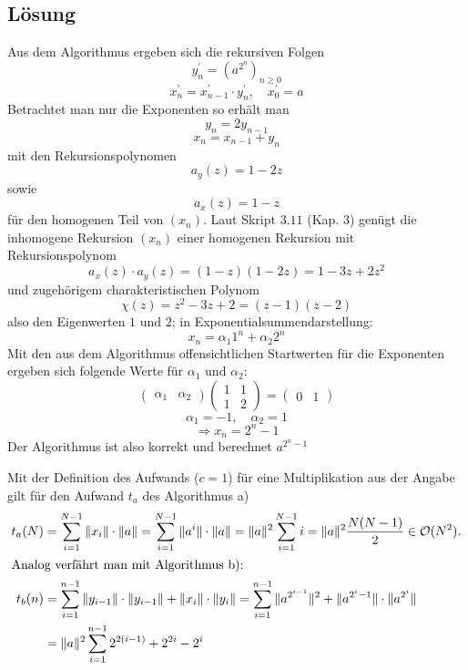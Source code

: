 \subsection*{Lösung}
\begin{flushenum}
\item
  Aus dem Algorithmus ergeben sich die rekursiven Folgen
  \[ y_{n}^{'} = (a^{2^{n}})_{n\geq 0} \]
  \[ x_{n}^{'} = x_{n-1}^{'} \cdot y_{n}^{'}, \quad x_{0}^{'} = a \]
  Betrachtet man nur die Exponenten so erhält man
  \[ y_{n} = 2y_{n-1} \]
  \[ x_{n} = x_{n-1} + y_{n} \]
  mit den Rekursionspolynomen
  \[ a_{y}(z) = 1 - 2z \]
  sowie
  \[ a_{x}(z) = 1 - z \]
  für den homogenen Teil von $(x_{n})$.
  Laut Skript $3.11$ (Kap. $3$) genügt die inhomogene Rekursion $(x_{n})$ einer
  homogenen Rekursion mit Rekursionspolynom
  \[ a_{x}(z) \cdot a_{y}(z) = (1 - z)(1 - 2z) = 1 - 3z + 2z^{2} \]
  und zugehörigem charakteristischen Polynom
  \[ \chi(z)= z^{2} - 3z + 2 = (z - 1)(z - 2) \]
  also den Eigenwerten $1$ und $2$; in Exponentialsummendarstellung:
  \[ x_{n} = \alpha_{1}1^{n} + \alpha_{2}2^{n} \]
  Mit den aus dem Algorithmus offensichtlichen Startwerten für die Exponenten
  ergeben sich folgende Werte für $\alpha_{1}$ und $\alpha_{2}$:
  \[ \begin{pmatrix} \alpha_{1} & \alpha_{2} \end{pmatrix} 
     \begin{pmatrix} 1 & 1 \\ 1 & 2 \end{pmatrix} = \begin{pmatrix} 0 & 1
     \end{pmatrix} \]
  \[ \alpha_{1} = -1, \quad \alpha_{2} = 1 \]
  \[ \Rightarrow x_{n} = 2^{n} - 1 \]
  Der Algorithmus ist also korrekt und berechnet $a^{2^{n}-1}$
\item
  Mit der Definition des Aufwands ($c = 1$) für eine Multiplikation aus der
  Angabe gilt für den Aufwand $t_a$ des Algorithmus a)
  \begin{align*}
	  t_a(N) & = \sum_{i=1}^{N-1} \|x_i\| \cdot \|a\| = \sum_{i=1}^{N-1} \|a^i\|
	  \cdot \|a\| = \|a\|^2 \sum_{i=1}^{N-1} i = \|a\|^2 \frac{N(N-1)}{2} \in
	  \mathcal{O}(N^2). \\
	  \intertext{\noindent Analog verfährt man mit Algorithmus b):}
	  t_b(n) & = \sum_{i=1}^{n-1} \|y_{i-1}\| \cdot \|y_{i-1}\| + \|x_i\|
	  \cdot \|y_i\| = \sum_{i=1}^{n-1} \|a^{2^{i-1}}\|^2 + \|a^{2^i - 1}\|
	  \cdot \|a^{2^i}\| \\
	  & = \|a\|^2 \sum_{i=1}^{n-1} 2^{2(i-1)} + 2^{2i} - 2^i \\

\end{align*}
\end{flushenum}
